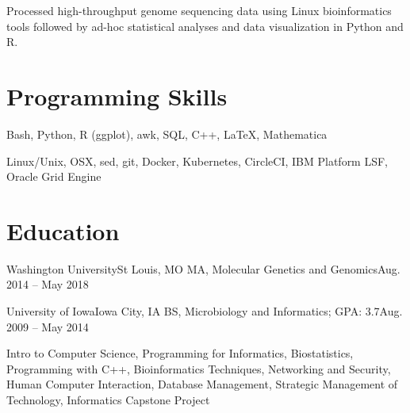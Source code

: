             {Processed high-throughput genome sequencing data using Linux bioinformatics tools followed by ad-hoc statistical analyses and data visualization in Python and R.}

        \resumeItemListEnd

    \resumeSubHeadingListEnd
    
\section{Programming Skills}
    \resumeSubHeadingListStart

        {Bash, Python, R (ggplot), awk, SQL, C++, \LaTeX, Mathematica}
          
        {Linux/Unix, OSX, sed, git, Docker, Kubernetes, CircleCI, IBM Platform LSF, Oracle Grid Engine}
          
    \resumeSubHeadingListEnd

\section{Education}
   \resumeSubHeadingListStart
   
      \resumeSubheading
      {Washington University}{St Louis, MO}
      {MA, Molecular Genetics and Genomics}{Aug. 2014 -- May 2018}
      
      \resumeSubheading
      {University of Iowa}{Iowa City, IA}
      {BS, Microbiology and Informatics;  GPA: 3.7}{Aug. 2009 -- May 2014}
      
      \resumeItemListStart
      
         {Intro to Computer Science, Programming for Informatics, Biostatistics, Programming with C++, Bioinformatics Techniques, Networking and Security, Human Computer Interaction, Database Management, Strategic Management of Technology, Informatics Capstone Project}
      
      \resumeItemListEnd
   
   \resumeSubHeadingListEnd

